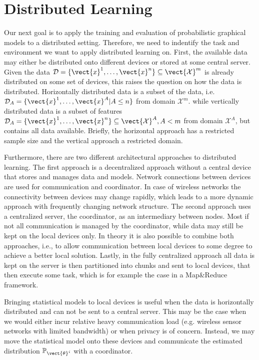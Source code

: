 \section{Distributed Learning}
Our next goal is to apply the training and evaluation of probabilistic graphical models to a distributed setting.
Therefore, we need to indentify the task and environment we want to apply distributed learning on.
First, the available data may either be distributed onto different devices or stored at some central server.
Given the data $\mathcal{D} = \{\vect{x}^1, \ldots, \vect{x}^n\} \subseteq \vect{\mathcal{X}}^m$ is already distributed on some set of devices, this raises the question on how the data is distributed.
Horizontally distributed data is a subset of the data, i.e. $\mathcal{D}_{A} = \{\vect{x}^1, \ldots, \vect{x}^A \lvert A \leq n\}$ from domain $\mathcal{X}^m$. while vertically distributed data is a subset of features $\mathcal{D}_{A} = \{\vect{x}^1, \ldots, \vect{x}^n \} \subseteq \vect{\mathcal{X}}^A, A < m$ from domain $\mathcal{X}^A$, but contains all data available.
Briefly, the horizontal approach has a restricted sample size and the vertical approach a restricted domain.

Furthermore, there are two different architectural approaches to distributed learning. 
The first approach is a decentralized approach without a central device that stores and manages data and models.
Network connections between devices are used for communication and coordinator.
In case of wireless networks the connectivity between devices may change rapidly, which leads to a more dynamic approach with frequently changing network structure.
The second approach uses a centralized server, the coordinator, as an intermediary between nodes. 
Most if not all communication is managed by the coordinator, while data may still be kept on the local devices only.
In theory it is also possible to combine both approaches, i.e., to allow communication between local devices to some degree to achieve a better local solution.
Lastly, in the fully centralized approach all data is kept on the server is then partitioned into chunks and sent to local devices, that then execute some task, which is for example the case in a Map\&Reduce framework.

Bringing statistical models to local devices is useful when the data is horizontally distributed and can not be sent to a central server.
This may be the case when we would either incur relative heavy communication load (e.g. wireless sensor networks with limited bandwidth) or when privacy is of concern.
Instead, we may move the statistical model onto these devices and communicate the estimated distribution $\mathbb{P}_{\vect{\theta}^i}$ with a coordinator.

